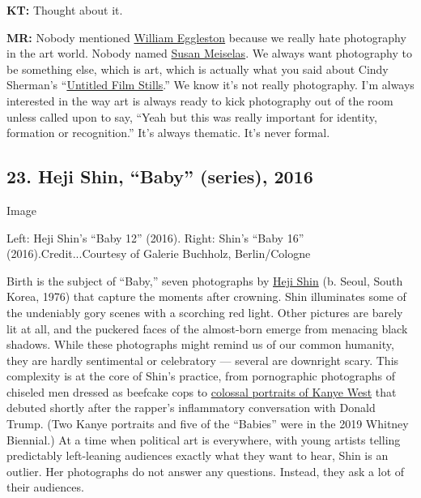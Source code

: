 \textbf{KT:} Thought about it.

\textbf{MR:} Nobody mentioned
\href{https://www.nytimes.com/2016/10/17/t-magazine/william-eggleston-photographer-interview-augusten-burroughs.html}{William
Eggleston} because we really hate photography in the art world. Nobody
named
\href{https://www.nytimes.com/2018/07/03/lens/susan-meiselas-mediations.html}{Susan
Meiselas}. We always want photography to be something else, which is
art, which is actually what you said about Cindy Sherman's
``\href{https://www.moma.org/learn/moma_learning/cindy-sherman-untitled-film-stills-1977-80/}{Untitled
Film Stills}.'' We know it's not really photography. I'm always
interested in the way art is always ready to kick photography out of the
room unless called upon to say, ``Yeah but this was really important for
identity, formation or recognition.'' It's always thematic. It's never
formal.

\hypertarget{23-heji-shin-baby-series-2016}{%
\subsection{23. Heji Shin, ``Baby'' (series),
2016}\label{23-heji-shin-baby-series-2016}}

Image

Left: Heji Shin's ``Baby 12'' (2016). Right: Shin's ``Baby 16''
(2016).Credit...Courtesy of Galerie Buchholz, Berlin/Cologne

Birth is the subject of ``Baby,'' seven photographs by
\href{http://www.hejishin.com/}{Heji Shin} (b. Seoul, South Korea, 1976)
that capture the moments after crowning. Shin illuminates some of the
undeniably gory scenes with a scorching red light. Other pictures are
barely lit at all, and the puckered faces of the almost-born emerge from
menacing black shadows. While these photographs might remind us of our
common humanity, they are hardly sentimental or celebratory --- several
are downright scary. This complexity is at the core of Shin's practice,
from pornographic photographs of chiseled men dressed as beefcake cops
to
\href{https://www.galeriebuchholz.de/exhibitions/heji-shin-berlin-2019/}{colossal
portraits of Kanye West} that debuted shortly after the rapper's
inflammatory conversation with Donald Trump. (Two Kanye portraits and
five of the ``Babies'' were in the 2019 Whitney Biennial.) At a time
when political art is everywhere, with young artists telling predictably
left-leaning audiences exactly what they want to hear, Shin is an
outlier. Her photographs do not answer any questions. Instead, they ask
a lot of their audiences.

